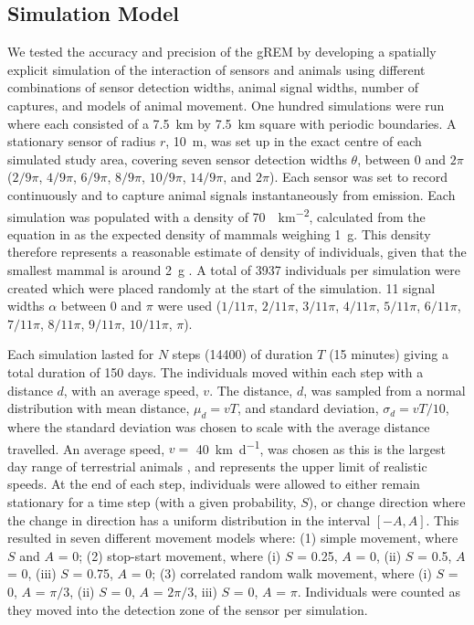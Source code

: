 \documentclass[a4paper,10pt,reqno,oneside]{amsart}
\begin{document}
\subsection*{Simulation Model}

We tested the accuracy and precision of the gREM by developing a spatially explicit simulation of the interaction of sensors and animals using different combinations of sensor detection widths, animal signal widths, number of captures, and models of animal movement. One hundred simulations were run where each consisted of a  \SI{7.5}{\kilo\meter} by \SI{7.5}{\kilo\meter} square with periodic boundaries. A stationary sensor of radius $r$, \SI{10}{\meter}, was set up in the exact centre of each simulated study area, covering seven sensor detection widths $\theta$, between 0 and $2\pi$ ($2/9\pi$, $4/9\pi$, $6/9\pi$, $8/9\pi$, $10/9\pi$, $14/9\pi$, and $2\pi$). Each sensor was set to record continuously and to capture animal signals instantaneously from emission. Each simulation was populated with a density of \SI{70}{\animals\per\kilo\meter\squared}, calculated from the equation in \cite{damuth1981population} as the expected density of mammals weighing \SI{1}{\gram}. This density therefore represents a reasonable estimate of density of individuals, given that the smallest mammal is around \SI{2}{\gram} \citep{jones2009pantheria}. A total of 3937 individuals per simulation were created which were placed randomly at the start of the simulation. 11 signal widths $\alpha$ between 0 and $\pi$ were used ($1/11\pi$, $2/11\pi$, $3/11\pi$, $4/11\pi$, $5/11\pi$, $6/11\pi$, $7/11\pi$, $8/11\pi$, $9/11\pi$, $10/11\pi$, $\pi$). 

Each simulation lasted for $N$ steps (14400) of duration $T$ (15 minutes) giving a total duration of 150 days. The individuals moved within each step with a distance $d$, with an average speed, $v$. The distance, $d$, was sampled from a normal distribution with mean distance, $\mu_d = vT$, and standard deviation, $\sigma_d = vT/10$, where the standard deviation was chosen to scale with the average distance travelled. An average speed, $v = $ \SI{40}{\kilo\meter \per \day}, was chosen as this is the largest day range of terrestrial animals \citep{carbone2005far}, and represents the upper limit of realistic speeds. At the end of each step, individuals were allowed to either remain stationary for a time step (with a given probability, $S$), or change direction where the change in direction has a uniform distribution in the interval $\left[-A, A\right]$. This resulted in seven different movement models where: (1) simple movement, where $S$ and $A$ = 0; (2) stop-start movement, where (i) $S$ = 0.25, $A$ = 0, (ii) $S$ = 0.5, $A$ = 0, (iii) $S$ = 0.75, $A$ = 0; (3) correlated random walk movement, where (i) $S$ = 0, $A$ = $\pi/3$, (ii) $S$ = 0, $A$ = $2\pi/3$, iii) $S$ = 0, $A$ = $\pi$. Individuals were counted as they moved into the detection zone of the sensor per simulation. 
\end{document}
